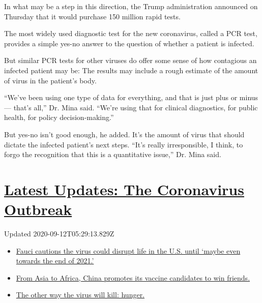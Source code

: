 In what may be a step in this direction, the Trump administration
announced on Thursday that it would purchase 150 million rapid tests.

The most widely used diagnostic test for the new coronavirus, called a
PCR test, provides a simple yes-no answer to the question of whether a
patient is infected.

But similar PCR tests for other viruses do offer some sense of how
contagious an infected patient may be: The results may include a rough
estimate of the amount of virus in the patient's body.

``We've been using one type of data for everything, and that is just
plus or minus --- that's all,'' Dr. Mina said. ``We're using that for
clinical diagnostics, for public health, for policy decision-making.''

But yes-no isn't good enough, he added. It's the amount of virus that
should dictate the infected patient's next steps. ``It's really
irresponsible, I think, to forgo the recognition that this is a
quantitative issue,'' Dr. Mina said.

\hypertarget{latest-updates-the-coronavirus-outbreak}{%
\section{\texorpdfstring{\href{https://www.nytimes3xbfgragh.onion/2020/09/11/world/covid-19-coronavirus.html?action=click\&pgtype=Article\&state=default\&region=MAIN_CONTENT_1\&context=storylines_live_updates}{Latest
Updates: The Coronavirus
Outbreak}}{Latest Updates: The Coronavirus Outbreak}}\label{latest-updates-the-coronavirus-outbreak}}

Updated 2020-09-12T05:29:13.829Z

\begin{itemize}
\tightlist
\item
  \href{https://www.nytimes3xbfgragh.onion/2020/09/11/world/covid-19-coronavirus.html?action=click\&pgtype=Article\&state=default\&region=MAIN_CONTENT_1\&context=storylines_live_updates\#link-dfb8a16}{Fauci
  cautions the virus could disrupt life in the U.S. until `maybe even
  towards the end of 2021.'}
\item
  \href{https://www.nytimes3xbfgragh.onion/2020/09/11/world/covid-19-coronavirus.html?action=click\&pgtype=Article\&state=default\&region=MAIN_CONTENT_1\&context=storylines_live_updates\#link-7104d154}{From
  Asia to Africa, China promotes its vaccine candidates to win friends.}
\item
  \href{https://www.nytimes3xbfgragh.onion/2020/09/11/world/covid-19-coronavirus.html?action=click\&pgtype=Article\&state=default\&region=MAIN_CONTENT_1\&context=storylines_live_updates\#link-393ad215}{The
  other way the virus will kill: hunger.}
\end{itemize}

